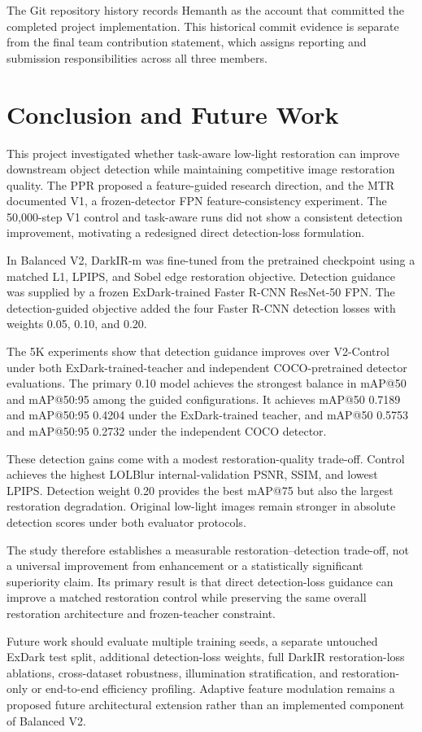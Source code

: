 The Git repository history records Hemanth as the account that committed
the completed project implementation. This historical commit evidence is
separate from the final team contribution statement, which assigns
reporting and submission responsibilities across all three members.

\section{Conclusion and Future Work}
\label{sec:conclusion}

This project investigated whether task-aware low-light restoration can
improve downstream object detection while maintaining competitive image
restoration quality. The PPR proposed a feature-guided research direction,
and the MTR documented V1, a frozen-detector FPN feature-consistency
experiment. The 50,000-step V1 control and task-aware runs did not show a
consistent detection improvement, motivating a redesigned direct
detection-loss formulation.

In Balanced V2, DarkIR-m was fine-tuned from the pretrained checkpoint
using a matched L1, LPIPS, and Sobel edge restoration objective. Detection
guidance was supplied by a frozen ExDark-trained Faster R-CNN ResNet-50
FPN. The detection-guided objective added the four Faster R-CNN detection
losses with weights 0.05, 0.10, and 0.20.

The 5K experiments show that detection guidance improves over V2-Control
under both ExDark-trained-teacher and independent COCO-pretrained detector
evaluations. The primary 0.10 model achieves the strongest balance in
mAP@50 and mAP@50:95 among the guided configurations. It achieves
mAP@50 0.7189 and mAP@50:95 0.4204 under the ExDark-trained teacher, and
mAP@50 0.5753 and mAP@50:95 0.2732 under the independent COCO detector.

These detection gains come with a modest restoration-quality trade-off.
Control achieves the highest LOLBlur internal-validation PSNR, SSIM, and
lowest LPIPS. Detection weight 0.20 provides the best mAP@75 but also
the largest restoration degradation. Original low-light images remain
stronger in absolute detection scores under both evaluator protocols.

The study therefore establishes a measurable restoration--detection
trade-off, not a universal improvement from enhancement or a statistically
significant superiority claim. Its primary result is that direct
detection-loss guidance can improve a matched restoration control while
preserving the same overall restoration architecture and frozen-teacher
constraint.

Future work should evaluate multiple training seeds, a separate untouched
ExDark test split, additional detection-loss weights, full DarkIR
restoration-loss ablations, cross-dataset robustness, illumination
stratification, and restoration-only or end-to-end efficiency profiling.
Adaptive feature modulation remains a proposed future architectural
extension rather than an implemented component of Balanced V2.
